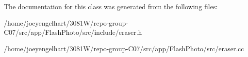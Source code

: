The documentation for this class was generated from the following files\+:\begin{DoxyCompactItemize}
\item 
/home/joeyengelhart/3081\+W/repo-\/group-\/\+C07/src/app/\+Flash\+Photo/src/include/eraser.\+h\item 
/home/joeyengelhart/3081\+W/repo-\/group-\/\+C07/src/app/\+Flash\+Photo/src/eraser.\+cc\end{DoxyCompactItemize}
